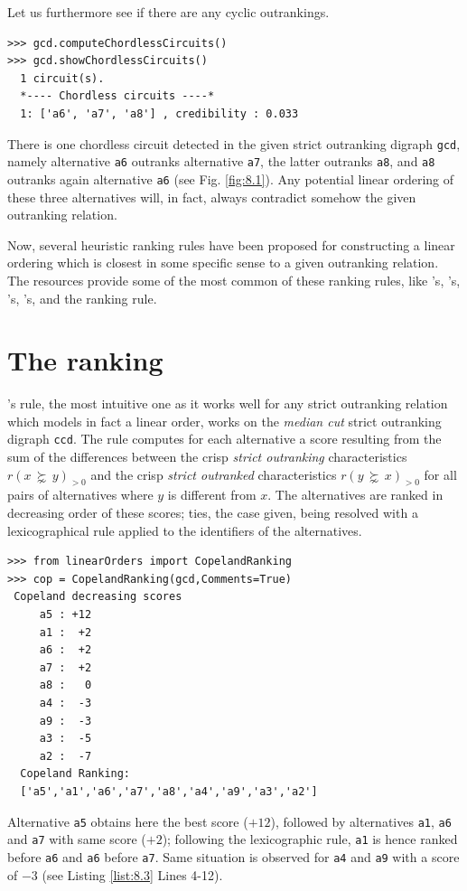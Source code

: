 Let us furthermore see if there are any cyclic outrankings.
\begin{lstlisting}
>>> gcd.computeChordlessCircuits()
>>> gcd.showChordlessCircuits()
  1 circuit(s).
  *---- Chordless circuits ----*    
  1: ['a6', 'a7', 'a8'] , credibility : 0.033
\end{lstlisting}
There is one chordless circuit detected in the given strict outranking digraph \texttt{gcd}, namely alternative \texttt{a6} outranks alternative \texttt{a7}, the latter outranks \texttt{a8}, and \texttt{a8} outranks again alternative \texttt{a6} (see Fig. \ref{fig:8.1}). Any potential linear ordering of these three alternatives will, in fact, always contradict somehow the given outranking relation.

Now, several heuristic ranking rules have been proposed for constructing a linear ordering which is closest in some specific sense to a given outranking relation. The \Digraph resources provide some of the most common of these ranking rules, like \Copeland 's, \Kemeny 's, \Slater 's, \Kohler 's, and the \RankedPairs ranking rule.

\section{The \Copeland ranking}
\label{sec:8.2}

\Copeland 's rule, the most intuitive one as it works well for any strict outranking relation which models in fact a linear order, works on the \emph{median cut} strict outranking digraph \texttt{ccd}. The rule computes for each alternative a score resulting from the sum of the differences between the crisp \emph{strict outranking} characteristics $r(x\, \succnsim \,y)_{>0}$ and the crisp \emph{strict outranked} characteristics $r(y\, \succnsim \, x)_{>0}$  for all pairs of alternatives where $y$ is different from $x$. The alternatives are ranked in decreasing order of these \Copeland scores; ties, the case given, being resolved with a lexicographical rule applied to the identifiers of the alternatives. 

\begin{lstlisting}[caption={Computing a \Copeland Ranking},label=list:8.3]
>>> from linearOrders import CopelandRanking
>>> cop = CopelandRanking(gcd,Comments=True)
 Copeland decreasing scores
     a5 : +12
     a1 :  +2
     a6 :  +2
     a7 :  +2
     a8 :   0
     a4 :  -3
     a9 :  -3
     a3 :  -5
     a2 :  -7
  Copeland Ranking:
  ['a5','a1','a6','a7','a8','a4','a9','a3','a2']
\end{lstlisting}
Alternative \texttt{a5} obtains here the best \Copeland score ($+12$), followed by alternatives \texttt{a1}, \texttt{a6} and \texttt{a7} with same score ($+2$); following the lexicographic rule, \texttt{a1} is hence ranked before \texttt{a6} and \texttt{a6} before \texttt{a7}. Same situation is observed for \texttt{a4} and \texttt{a9} with a score of $-3$ (see Listing \ref{list:8.3} Lines 4-12).

